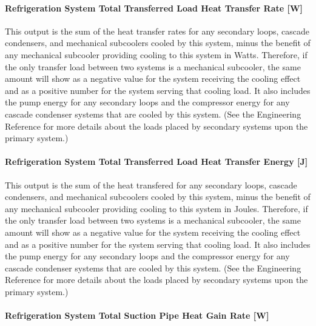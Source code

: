 \paragraph{Refrigeration System Total Transferred Load Heat Transfer Rate {[}W{]}}\label{refrigeration-system-total-transferred-load-heat-transfer-rate-w}

This output is the sum of the heat transfer rates for any secondary loops, cascade condensers, and mechanical subcoolers cooled by this system, minus the benefit of any mechanical subcooler providing cooling to this system in Watts. Therefore, if the only transfer load between two systems is a mechanical subcooler, the same amount will show as a negative value for the system receiving the cooling effect and as a positive number for the system serving that cooling load. It also includes the pump energy for any secondary loops and the compressor energy for any cascade condenser systems that are cooled by this system. (See the Engineering Reference for more details about the loads placed by secondary systems upon the primary system.)

\paragraph{Refrigeration System Total Transferred Load Heat Transfer Energy {[}J{]}}\label{refrigeration-system-total-transferred-load-heat-transfer-energy-j}

This output is the sum of the heat transfered for any secondary loops, cascade condensers, and mechanical subcoolers cooled by this system, minus the benefit of any mechanical subcooler providing cooling to this system in Joules. Therefore, if the only transfer load between two systems is a mechanical subcooler, the same amount will show as a negative value for the system receiving the cooling effect and as a positive number for the system serving that cooling load. It also includes the pump energy for any secondary loops and the compressor energy for any cascade condenser systems that are cooled by this system. (See the Engineering Reference for more details about the loads placed by secondary systems upon the primary system.)

\paragraph{Refrigeration System Total Suction Pipe Heat Gain Rate {[}W{]}}\label{refrigeration-system-total-suction-pipe-heat-gain-rate-w}

